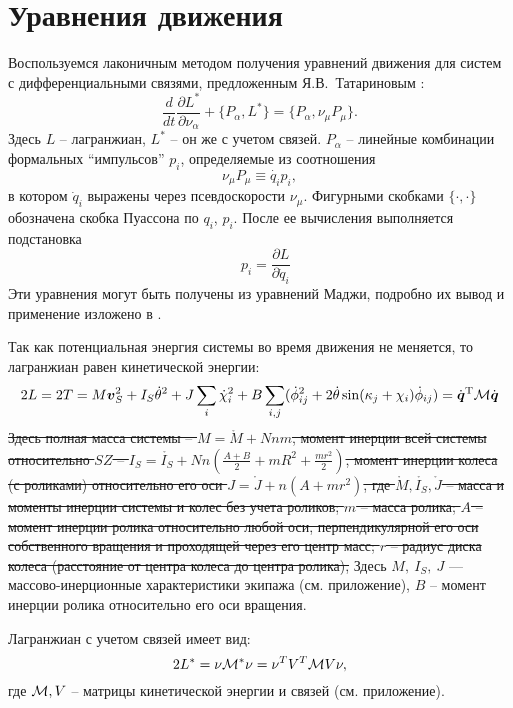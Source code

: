 \section{Уравнения движения}

Воспользуемся лаконичным методом получения уравнений движения для систем с дифференциальными связями, предложенным Я.В.~Татариновым \cite{Tatarinov}:
\begin{equation}\label{Tatarinov}
    \frac{d}{dt}\frac{\partial L^{*}}{\partial \nu_\alpha}  + \{P_\alpha, L^{*}\} = \{P_\alpha, \nu_\mu P_\mu\}.
\end{equation}
Здесь $L$ -- лагранжиан, $L^*$ -- он же с учетом связей. $P_\alpha$ -- линейные комбинации формальных ``импульсов'' $p_i$, определяемые из соотношения 
$$\nu_\mu P_\mu \equiv \dot{q_i} p_i,$$
 в котором $\dot{q}_i$ выражены через псевдоскорости $\nu_\mu$. Фигурными скобками $\{\cdot, \cdot\}$ обозначена скобка Пуассона по $q_i$, $p_i$. После ее вычисления выполняется подстановка 
$$\hspace{10pt} p_i = \frac{\partial L}{\partial \dot{q}_i}$$
Эти уравнения могут быть получены из уравнений Маджи, подробно их вывод и применение изложено в \cite{Tatarinov,Zobova2011,Zobova_ND}.

Так как потенциальная энергия системы во время движения не меняется, то лагранжиан  равен кинетической энергии:
\begin{equation}\label{kin_en}
    2L = 2T = M\vec{v}_S^2 + I_S\dot{\theta}^2 + J\sum_i\dot{\chi}_i^2 + B\sum_{i,j}(\dot{\phi}_{ij}^2 + 2\dot{\theta}\sin(\kappa_j + \chi_i)\dot{\phi}_{ij})=\dot{\vec{q}}^\mathrm{T}\M\dot{\vec{q}}
\end{equation}
\sout{Здесь полная масса системы -- $M = \mathring{M} + Nnm$, момент инерции всей системы относительно $SZ$ -- $I_S = \mathring{I_S} + Nn(\frac{A+B}{2} + mR^2 + \frac{mr^2}{2})$, момент инерции колеса (с роликами) относительно его оси $J = \mathring{J} + n(A + mr^2)$, где $\mathring{M}, \mathring{I_S}, \mathring{J}$ -- масса и моменты инерции системы и колес без учета роликов; $m$ -- масса ролика; $A$ -- момент инерции ролика относительно любой оси, перпендикулярной его оси собственного вращения и проходящей через его центр масс; $r$ -- радиус диска колеса (расстояние от центра колеса до центра ролика),}
Здесь $M,\ I_S,\ J$ --- массово-инерционные характеристики экипажа (см. приложение), $B$ -- момент инерции ролика относительно его оси вращения.

Лагранжиан с учетом связей имеет вид:
$$ 2L^{*} = \nu \mathcal{M}^*\nu = \nu^T V^T\mathcal{M} V\nu, $$
где $\mathcal{M}, V$ -- матрицы кинетической энергии и связей (см. приложение).


